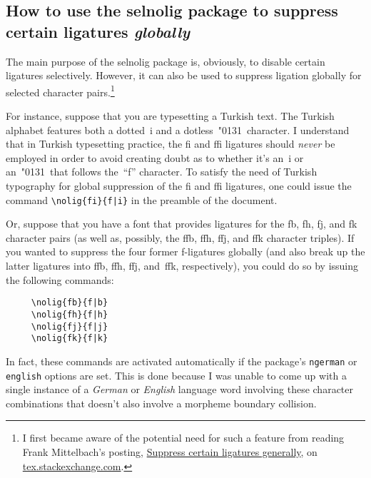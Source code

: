 \documentclass[11pt]{article}
\newcommand{\pkg}[1]{\textsf{#1}}
\newcommand{\opt}[1]{\texttt{#1}}
\begin{document}
\subsection[How to use the selnolig package to suppress certain ligatures globally]{How to use the \pkg{selnolig} package to suppress certain ligatures \emph{globally}}
\label{sec:global-nolig}


The main purpose of the \pkg{selnolig} package is, obviously, to disable certain ligatures selectively. However, it can also be used to suppress ligation globally for selected character pairs.\footnote{I first became aware of the potential need for such a feature from reading Frank Mittelbach's posting, \href{http://tex.stackexchange.com/q/61042/5001}{Suppress certain ligatures generally}, on \url{tex.stackexchange.com}. } 

For instance, suppose that you are typesetting a Turkish text. The Turkish alphabet features both a dotted~i and a dotless~\char"0131\ character. I understand that in Turkish typesetting practice, the fi and ffi ligatures should \emph{never} be employed in order to avoid creating doubt as to whether it's an~i or an~\char"0131\ that follows the~\enquote{f} character. To satisfy the need of Turkish typography for global suppression of the fi and ffi ligatures, one could issue the command \Verb+\nolig{fi}{f|i}+ in the preamble of the document. 


Or, suppose that you have a font that provides ligatures for the \mbox{fb}, \mbox{fh}, \mbox{fj}, and \mbox{fk} character pairs (as well as, possibly, the \mbox{ffb}, \mbox{ffh}, \mbox{ffj}, and \mbox{ffk} character triples). If you wanted to suppress the four former f-ligatures globally (and also break up the latter ligatures into ff\breaklig{}b, ff\breaklig{}h, ff\breaklig{}j, and~ff\breaklig{}k, respectively), you could do so by issuing the following commands: 
\begin{Verbatim}
     \nolig{fb}{f|b}
     \nolig{fh}{f|h}
     \nolig{fj}{f|j}
     \nolig{fk}{f|k}
\end{Verbatim}

In fact, these commands are activated automatically if the package's \opt{ngerman} or \opt{english} options are set. This is done because I was unable to come up with a single instance of a \emph{German} or \emph{English} language word involving these character combinations that doesn't also involve a morpheme boundary collision.
\end{document}
